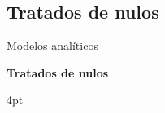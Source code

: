 \documentclass[pdf]{beamer}
\def\\{}%
\def\vspace{}%
\begin{document}
{%
    \subsection{Tratados de nulos}
\begin{frame}{Modelos analíticos}
    \begin{Large}
        \textbf{Tratados de nulos}
    \end{Large}
    \vspace{4pt}


\end{frame}}
\end{document}
